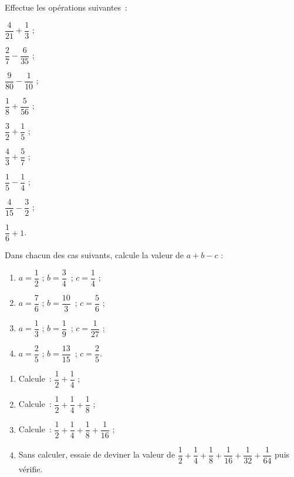 \begin{exercice}
Effectue les opérations suivantes : 
\vspace{.5cm}
\begin{colenumerate}{3}
 \item $\dfrac{4}{21} + \dfrac{1}{3}$ ;
 \vspace{0.2cm}
 \item $\dfrac{2}{7} - \dfrac{6}{35}$ ;
 \vspace{0.2cm}
 \item $\dfrac{9}{80} - \dfrac{1}{10}$ ;
 \item $\dfrac{1}{8} + \dfrac{5}{56}$ ;
 \item $\dfrac{3}{2} + \dfrac{1}{5}$ ;
 \item $\dfrac{4}{3} + \dfrac{5}{7}$ ;
 \item $\dfrac{1}{5} - \dfrac{1}{4}$ ;
 \item $\dfrac{4}{15} - \dfrac{3}{2}$ ;
  \item $\dfrac{1}{6} + 1$.
 \end{colenumerate}
\end{exercice}


\begin{exercice}
Dans chacun des cas suivants, calcule la valeur de $a + b -  c$ : 
\vspace{.5cm}
\begin{enumerate}
 \item $a = \dfrac{1}{2}$ ; $b = \dfrac{3}{4}$ ; $c = \dfrac{1}{4}$ ;
  \vspace{0.2cm}
 \item $a = \dfrac{7}{6}$ ; $b = \dfrac{10}{3}$ ; $c = \dfrac{5}{6}$ ;
  \vspace{0.2cm}
 \item $a = \dfrac{1}{3}$ ; $b = \dfrac{1}{9}$ ; $c = \dfrac{1}{27}$ ;
  \vspace{0.2cm}
 \item $a = \dfrac{2}{5}$ ; $b = \dfrac{13}{15}$ ; $c = \dfrac{2}{5}$.
 \end{enumerate}
\end{exercice}



\begin{exercice}[Étonnant !]
\begin{enumerate}
 \item Calcule : $\dfrac{1}{2} + \dfrac{1}{4}$ ;
  \vspace{0.2cm}
 \item Calcule : $\dfrac{1}{2} + \dfrac{1}{4} + \dfrac{1}{8}$ ;
  \vspace{0.2cm}
 \item Calcule : $\dfrac{1}{2} + \dfrac{1}{4} + \dfrac{1}{8} + \dfrac{1}{16}$ ;
  \vspace{0.2cm}
 \item Sans calculer, essaie de deviner la valeur de $\dfrac{1}{2} + \dfrac{1}{4} + \dfrac{1}{8} + \dfrac{1}{16} + \dfrac{1}{32} + \dfrac{1}{64}$ puis vérifie.
 \end{enumerate}
\end{exercice}


